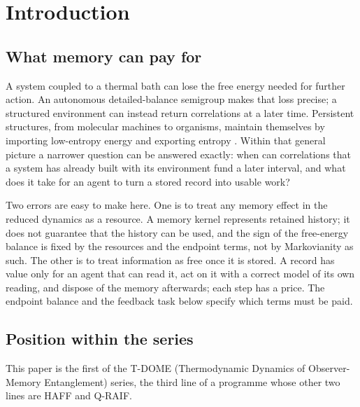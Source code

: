 \documentclass[12pt]{article}
\begin{document}
\section{Introduction}
\label{sec:intro}

\subsection{What memory can pay for}

A system coupled to a thermal bath can lose the free energy needed for further action. An autonomous detailed-balance semigroup makes that loss precise; a structured environment can instead return correlations at a later time. Persistent structures, from molecular machines to organisms, maintain themselves by importing low-entropy energy and exporting entropy \cite{Schrodinger1944}. Within that general picture a narrower question can be answered exactly: when can correlations that a system has already built with its environment fund a later interval, and what does it take for an agent to turn a stored record into usable work?

Two errors are easy to make here. One is to treat any memory effect in the reduced dynamics as a resource. A memory kernel represents retained history; it does not guarantee that the history can be used, and the sign of the free-energy balance is fixed by the resources and the endpoint terms, not by Markovianity as such. The other is to treat information as free once it is stored. A record has value only for an agent that can read it, act on it with a correct model of its own reading, and dispose of the memory afterwards; each step has a price. The endpoint balance and the feedback task below specify which terms must be paid.

\subsection{Position within the series}

This paper is the first of the T-DOME (Thermodynamic Dynamics of Observer-Memory Entanglement) series, the third line of a programme whose other two lines are HAFF and Q-RAIF.
\end{document}
